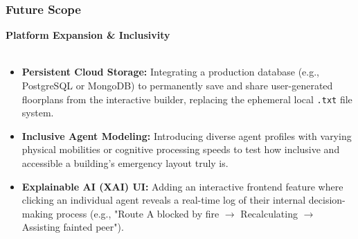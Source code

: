\documentclass{beamer}
\begin{document}
\begin{frame}
\frametitle{Future Scope}
\textbf{Platform Expansion \& Inclusivity} \\
\vspace{0.2cm}
\footnotesize 

\begin{itemize}
    \item \textbf{Persistent Cloud Storage:} Integrating a production database (e.g., PostgreSQL or MongoDB) to permanently save and share user-generated floorplans from the interactive builder, replacing the ephemeral local \texttt{.txt} file system.
    \item \textbf{Inclusive Agent Modeling:} Introducing diverse agent profiles with varying physical mobilities or cognitive processing speeds to test how inclusive and accessible a building's emergency layout truly is.
    \item \textbf{Explainable AI (XAI) UI:} Adding an interactive frontend feature where clicking an individual agent reveals a real-time log of their internal decision-making process (e.g., "Route A blocked by fire $\rightarrow$ Recalculating $\rightarrow$ Assisting fainted peer").
\end{itemize}
\end{frame}


\end{document}

